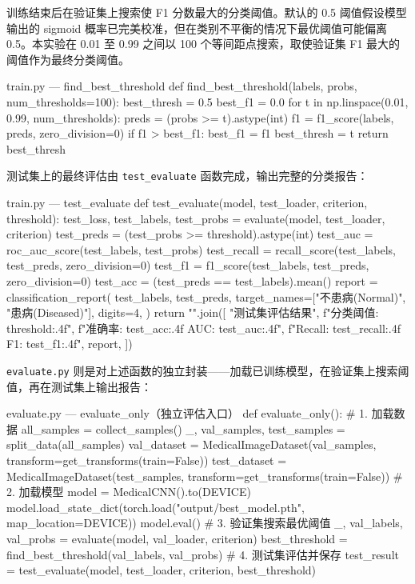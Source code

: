 \documentclass[12pt,a4paper]{ctexart}
\begin{document}
训练结束后在验证集上搜索使 F1 分数最大的分类阈值。默认的 0.5 阈值假设模型输出的 sigmoid 概率已完美校准，但在类别不平衡的情况下最优阈值可能偏离 0.5。本实验在 0.01 至 0.99 之间以 100 个等间距点搜索，取使验证集 F1 最大的阈值作为最终分类阈值。

\begin{pythoncode}{train.py — find\_best\_threshold}
def find_best_threshold(labels, probs, num_thresholds=100):
    best_thresh = 0.5
    best_f1 = 0.0
    for t in np.linspace(0.01, 0.99, num_thresholds):
        preds = (probs >= t).astype(int)
        f1 = f1_score(labels, preds, zero_division=0)
        if f1 > best_f1:
            best_f1 = f1
            best_thresh = t
    return best_thresh
\end{pythoncode}

测试集上的最终评估由 \texttt{test\_evaluate} 函数完成，输出完整的分类报告：

\begin{pythoncode}{train.py — test\_evaluate}
def test_evaluate(model, test_loader, criterion, threshold):
    test_loss, test_labels, test_probs = evaluate(model, test_loader, criterion)
    test_preds = (test_probs >= threshold).astype(int)
    test_auc = roc_auc_score(test_labels, test_probs)
    test_recall = recall_score(test_labels, test_preds, zero_division=0)
    test_f1 = f1_score(test_labels, test_preds, zero_division=0)
    test_acc = (test_preds == test_labels).mean()
    report = classification_report(
        test_labels, test_preds,
        target_names=["不患病(Normal)", "患病(Diseased)"],
        digits=4,
    )
    return "\n".join([
        "测试集评估结果",
        f"分类阈值: {threshold:.4f}",
        f"准确率: {test_acc:.4f}  AUC: {test_auc:.4f}",
        f"Recall: {test_recall:.4f}  F1: {test_f1:.4f}",
        report,
    ])
\end{pythoncode}

\texttt{evaluate.py} 则是对上述函数的独立封装——加载已训练模型，在验证集上搜索阈值，再在测试集上输出报告：

\begin{pythoncode}{evaluate.py — evaluate\_only（独立评估入口）}
def evaluate_only():
    # 1. 加载数据
    all_samples = collect_samples()
    _, val_samples, test_samples = split_data(all_samples)
    val_dataset  = MedicalImageDataset(val_samples,
                                       transform=get_transforms(train=False))
    test_dataset = MedicalImageDataset(test_samples,
                                       transform=get_transforms(train=False))
    # 2. 加载模型
    model = MedicalCNN().to(DEVICE)
    model.load_state_dict(torch.load("output/best_model.pth",
                                     map_location=DEVICE))
    model.eval()
    # 3. 验证集搜索最优阈值
    _, val_labels, val_probs = evaluate(model, val_loader, criterion)
    best_threshold = find_best_threshold(val_labels, val_probs)
    # 4. 测试集评估并保存
    test_result = test_evaluate(model, test_loader, criterion, best_threshold)
\end{pythoncode}
\end{document}
